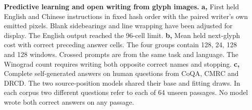 \textbf{Predictive learning and open writing from glyph images.}
\textbf{a,} First held English and Chinese instructions in fixed hash order with the paired writer's own emitted pixels. Blank sidebearings and line wrapping have been adjusted for display. The English output reached the 96-cell limit. \textbf{b,} Mean held next-glyph cost with correct preceding answer cells. The four groups contain 128, 24, 128 and 128 windows. Crossed prompts are from the same task and language. The Winograd count requires writing both opposite correct names and stopping. \textbf{c,} Complete self-generated answers on human questions from CoQA, CMRC and DRCD. The two source-position models shared their base and fitting draws. In each corpus two different questions refer to each of 64 unseen passages. No model wrote both correct answers on any passage.
